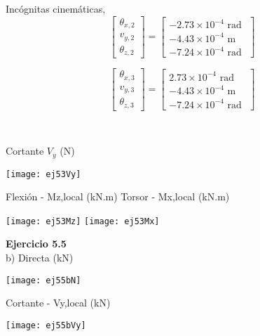 \begin{minipage}{0.45\textwidth}
	Incógnitas cinemáticas,
	$$
	\left[
	\begin{matrix}
	\theta_{x,2} \\
	v_{y,2} \\
	\theta_{z,2}
	\end{matrix}
	\right]
	=
	\left[
	\begin{matrix}
	-2.73\times 10^{-4} \text{ rad }\\
	-4.43\times 10^{-4} \text{ m }\\
	-7.24\times 10^{-4} \text{ rad }
	\end{matrix}
	\right]
	$$
	
	$$
	\left[
	\begin{matrix}
	\theta_{x,3} \\
	v_{y,3} \\
	\theta_{z,3}
	\end{matrix}
	\right]
	=
	\left[
	\begin{matrix}
	2.73\times 10^{-4} \text{ rad }\\
	-4.43\times 10^{-4} \text{ m }\\
	-7.24\times 10^{-4} \text{ rad }
	\end{matrix}
	\right]
	$$
\end{minipage}
~
\begin{minipage}{0.45\textwidth}
	Cortante $V_y$ (N)
	
	\texttt{[image: ej53Vy]}
\end{minipage}


Flexión - Mz,local (kN.m) \hfill  Torsor - Mx,local (kN.m)

\texttt{[image: ej53Mz]}
\texttt{[image: ej53Mx]}





\textbf{Ejercicio 5.5}\\


b)
Directa (kN)

	\begin{center}
	\texttt{[image: ej55bN]}
	\end{center}


Cortante - Vy,local (kN)

	\begin{center}
	\texttt{[image: ej55bVy]}
	\end{center}

